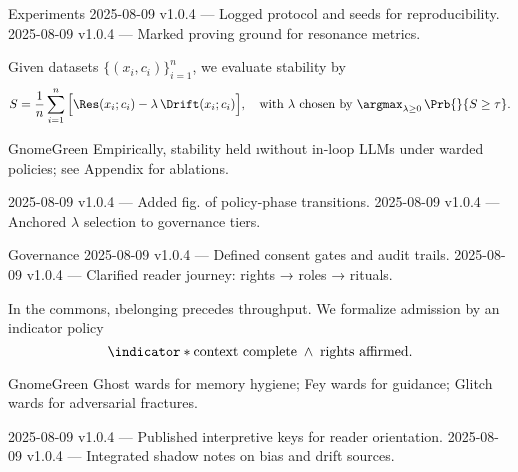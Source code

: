 
\begin{SectionHeaderLedger}{Experiments}
  2025-08-09 v1.0.4 — Logged protocol and seeds for reproducibility.
  2025-08-09 v1.0.4 — Marked proving ground for resonance metrics.
\end{SectionHeaderLedger}

Given datasets $\{(x_i, c_i)\}_{i=1}^n$, we evaluate stability by
\[
S = \frac{1}{n}\sum_{i=1}^n \Big[\Res(x_i;c_i) - \lambda\,\Drift(x_i;c_i)\Big],
\quad
\text{with }\lambda \text{ chosen by } \argmax_{\lambda \ge 0}\, \Prb{}{S \ge \tau}.
\]

\begin{callout}[Outcome]{GnomeGreen}
Empirically, stability held \i{without} in-loop LLMs under warded policies; see Appendix for ablations.
\end{callout}

\begin{SectionFooterLedger}
   2025-08-09 v1.0.4 — Added fig. of policy-phase transitions.
 2025-08-09 v1.0.4 — Anchored $\lambda$ selection to governance tiers.
\end{SectionFooterLedger}



\begin{SectionHeaderLedger}{Governance}
  2025-08-09 v1.0.4 — Defined consent gates and audit trails.
 2025-08-09 v1.0.4 — Clarified reader journey: rights → roles → rituals.
\end{SectionHeaderLedger}

In the commons, \i{belonging precedes throughput}. We formalize admission by an indicator policy
\[
\indicator*{ \text{context complete} \;\wedge\; \text{rights affirmed} }.
\]

\begin{callout}{GnomeGreen}
Ghost wards for memory hygiene; Fey wards for guidance; Glitch wards for adversarial fractures.
\end{callout}

\begin{SectionFooterLedger}
   2025-08-09 v1.0.4 — Published interpretive keys for reader orientation.
  2025-08-09 v1.0.4 — Integrated shadow notes on bias and drift sources.
\end{SectionFooterLedger}


